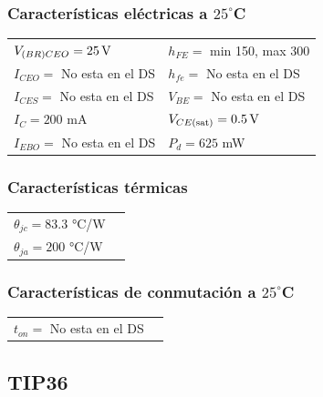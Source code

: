 \documentclass[chaptersright]{informeutn}
\begin{document}
   \subsubsection{Características eléctricas a $25^\circ$C}
    \begin{tabular}{ll}
    $V_{(BR)CEO} = 25 \,\mathrm{V}$         & \hspace{2cm} $h_{FE} =$ min 150, max 300 \\
    $I_{CEO} = $ No esta en el DS           & \hspace{2cm} $h_{fe} = $ No esta en el DS \\
    $I_{CES} = $ No esta en el DS               & \hspace{2cm} $V_{BE} =  $ No esta en el DS\\
    $I_C = 200$ mA                & \hspace{2cm} $V_{CE(\text{sat})} = 0.5 \,\mathrm{V} $ \\
    $I_{EBO} = $ No esta en el DS              & \hspace{2cm} $P_d = 625$ mW \\
    \end{tabular}
    
    \subsubsection{Características térmicas}
    \begin{tabular}{ll}
    $\theta_{jc} = 83.3$ °C/W \\
    $\theta_{ja} = 200$ °C/W \\
    \end{tabular}
    
    \subsubsection{Características de conmutación a $25^\circ$C}
    \begin{tabular}{ll}
    $t_{on} = $ No esta en el DS \\
    \end{tabular}


  \subsection{TIP36}
\end{document}
